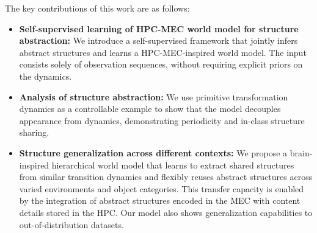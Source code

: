 The key contributions of this work are as follows:
\begin{itemize}
    \vspace{-0.2 cm}
    \item \textbf{Self-supervised learning of HPC-MEC world model for structure abstraction:} We introduce a self-supervised framework that jointly infers abstract structures and learns a HPC-MEC-inspired world model. The input consists solely of observation sequences, without requiring explicit priors on the dynamics.
    \item \textbf{Analysis of structure abstraction:} We use primitive transformation dynamics as a controllable example to show that the model decouples appearance from dynamics, demonstrating periodicity and in-class structure sharing.
     \item \textbf{Structure generalization across different contexts:} We propose a brain-inspired hierarchical world model that learns to extract shared structures from similar transition dynamics and flexibly reuses abstract structures across varied environments and object categories. This transfer capacity is enabled by the integration of abstract structures encoded in the MEC with content details stored in the HPC. Our model also shows generalization capabilities to out-of-distribution datasets.
    \vspace{-0.2 cm}
\end{itemize}